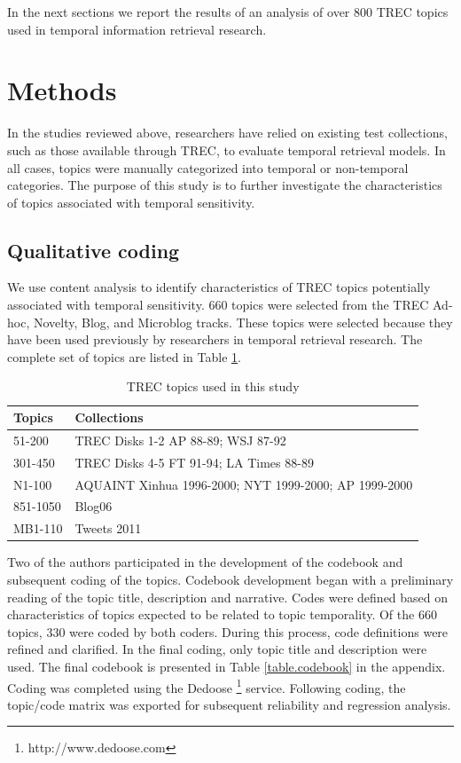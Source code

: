 \documentclass{sig-alternate}
\begin{document}
In the next sections we report the results of an analysis of over 800 TREC topics used in temporal information retrieval research. 

\section{Methods}

In the studies reviewed above, researchers have relied on existing test collections, such as those available through TREC, to evaluate temporal retrieval models. In all cases, topics were manually categorized into temporal or non-temporal categories. The purpose of this study is to further investigate the characteristics of topics associated with temporal sensitivity.

\subsection{Qualitative coding}
We use content analysis \cite{Krippendorf1980} to identify characteristics of TREC topics potentially associated with temporal sensitivity. 660 topics were selected from the TREC Ad-hoc, Novelty, Blog, and Microblog tracks. These topics were selected because they have been used previously by researchers in temporal retrieval research.  The complete set of topics are listed in Table \ref{table.topics}.

\begin{table}
\small
\begin{tabular}{| l |  p{5cm} |} \hline
\bf{Topics} & \bf{Collections}  \\ \hline
51-200 & TREC Disks 1-2 AP 88-89; WSJ 87-92 \\ \hline
301-450 &  TREC Disks 4-5 FT 91-94; LA Times 88-89 \\ \hline
N1-100 & AQUAINT Xinhua 1996-2000; NYT 1999-2000; AP 1999-2000 \\ \hline
851-1050 & Blog06  \\ \hline
MB1-110 & Tweets 2011 \\ \hline
\end{tabular}
\caption{TREC topics used in this study}
\label{table.topics}
\end{table}

Two of the authors participated in the development of the codebook and subsequent coding of the topics.  Codebook development began with a preliminary reading of the topic title, description and narrative. Codes were defined based on characteristics of topics expected to be related to topic temporality.  Of the 660 topics, 330 were coded by both coders. During this process, code definitions were refined and clarified. In the final coding, only topic title and description were used. The final codebook is presented in Table \ref{table.codebook} in the appendix.  Coding was completed using the Dedoose \footnote{http://www.dedoose.com} service.  Following coding, the topic/code matrix was exported for subsequent reliability and regression analysis.
\end{document}
